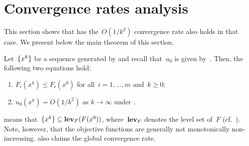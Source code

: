 \documentclass[../main]{subfiles}
\begin{document}
\section{Convergence rates analysis} 
This section shows that  has the~$O(1 / k^2)$ convergence rate also holds in that case.
We present below the main theorem of this section.
\begin{theorem} 
    Let~$\lbrace x^k\rbrace$ be a sequence generated by  and recall that~$u_0$ is given by~.
    Then, the following two equations hold:
    \begin{enumerate}
    \item $F_i(x^k) \le F_i(x^0)$ for all~$i = 1, \dots, m$ and~$k \ge 0$; 
    \item $u_0(x^k) = O(1 / k^2)$ as $k \to \infty$ under . 
    \end{enumerate}
\end{theorem}
 means that~$\lbrace x^k\rbrace \subseteq \operatorname{\mathbf{lev}}_F(F(x^0))$, where~$\operatorname{\mathbf{lev}}_F$ denotes the level set of~$F$ (cf.~).
Note, however, that the objective functions are generally not monotonically non-increasing.
 also claims the global convergence rate.
\end{document}
